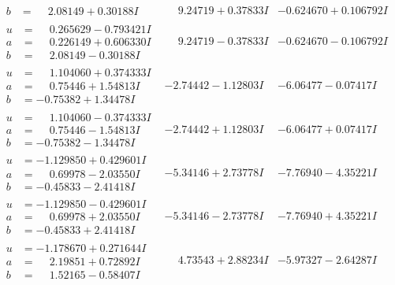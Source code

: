 \documentclass[1p]{elsarticle_modified}
\theoremstyle{definition}
\begin{document}
$$\begin{array}{c|c|c}
\begin{aligned}
b &= \phantom{-}2.08149 + 0.30188 I\end{aligned}
 & \phantom{-}9.24719 + 0.37833 I & -0.624670 + 0.106792 I \\ \hline\begin{aligned}
u &= \phantom{-}0.265629 - 0.793421 I \\
a &= \phantom{-}0.226149 + 0.606330 I \\
b &= \phantom{-}2.08149 - 0.30188 I\end{aligned}
 & \phantom{-}9.24719 - 0.37833 I & -0.624670 - 0.106792 I \\ \hline\begin{aligned}
u &= \phantom{-}1.104060 + 0.374333 I \\
a &= \phantom{-}0.75446 + 1.54813 I \\
b &= -0.75382 + 1.34478 I\end{aligned}
 & -2.74442 - 1.12803 I & -6.06477 - 0.07417 I \\ \hline\begin{aligned}
u &= \phantom{-}1.104060 - 0.374333 I \\
a &= \phantom{-}0.75446 - 1.54813 I \\
b &= -0.75382 - 1.34478 I\end{aligned}
 & -2.74442 + 1.12803 I & -6.06477 + 0.07417 I \\ \hline\begin{aligned}
u &= -1.129850 + 0.429601 I \\
a &= \phantom{-}0.69978 - 2.03550 I \\
b &= -0.45833 - 2.41418 I\end{aligned}
 & -5.34146 + 2.73778 I & -7.76940 - 4.35221 I \\ \hline\begin{aligned}
u &= -1.129850 - 0.429601 I \\
a &= \phantom{-}0.69978 + 2.03550 I \\
b &= -0.45833 + 2.41418 I\end{aligned}
 & -5.34146 - 2.73778 I & -7.76940 + 4.35221 I \\ \hline\begin{aligned}
u &= -1.178670 + 0.271644 I \\
a &= \phantom{-}2.19851 + 0.72892 I \\
b &= \phantom{-}1.52165 - 0.58407 I\end{aligned}
 & \phantom{-}4.73543 + 2.88234 I & -5.97327 - 2.64287 I \\ \hline\begin{aligned}

\end{aligned}
\end{array}$$
\end{document}
